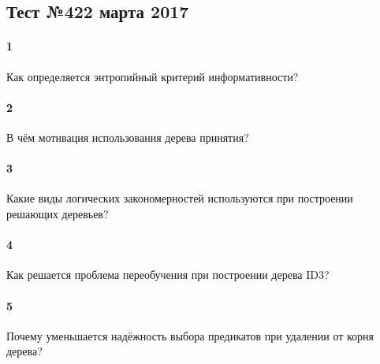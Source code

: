 \documentclass[a4paper,12pt]{article}
\begin{document}
  \subsection*{Тест №4\hfill{22 марта 2017}}

  \paragraph{1} Как определяется энтропийный критерий информативности?
  
  \makebox[\linewidth]{\hrulefill}
  \makebox[\linewidth]{\hrulefill}
  
  \paragraph{2} В чём мотивация использования дерева принятия?

  \makebox[\linewidth]{\hrulefill}
  \makebox[\linewidth]{\hrulefill}
  \makebox[\linewidth]{\hrulefill}
  \makebox[\linewidth]{\hrulefill}

  \paragraph{3} Какие виды логических закономерностей используются при построении решающих деревьев?

  \makebox[\linewidth]{\hrulefill}
  \makebox[\linewidth]{\hrulefill}
  \makebox[\linewidth]{\hrulefill}
  \makebox[\linewidth]{\hrulefill}

  \paragraph{4} Как решается проблема переобучения при построении дерева ID3?

  \makebox[\linewidth]{\hrulefill}
  \makebox[\linewidth]{\hrulefill}
  \makebox[\linewidth]{\hrulefill}
  \makebox[\linewidth]{\hrulefill}

  \paragraph{5} Почему уменьшается надёжность выбора предикатов при удалении от корня дерева?

  \makebox[\linewidth]{\hrulefill}
  \makebox[\linewidth]{\hrulefill}
  \makebox[\linewidth]{\hrulefill}
  \makebox[\linewidth]{\hrulefill}
  
\end{document}
